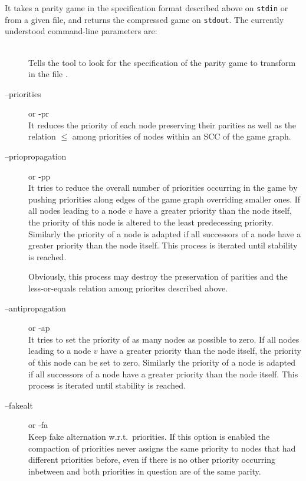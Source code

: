 It takes a parity game in the specification format described above
on \texttt{stdin} or from a given file, and returns the compressed game on \texttt{stdout}. The currently
understood command-line parameters are:
\begin{description}
\item[] \ \\
   Tells the tool to look for the specification of the parity game to transform in the file
   .

\item[{\ttfamily --priorities}] \enspace or {\ttfamily -pr} \\
    It reduces the priority of each node preserving their parities as well as the relation $\le$
    among priorities of nodes within an SCC of the game graph.

\item[{\ttfamily --priopropagation}] \enspace or {\ttfamily -pp} \\
    It tries to reduce the overall number of priorities occurring in the game by pushing priorities
    along edges of the game graph overriding smaller ones. If all nodes leading to a node $v$ have a
    greater priority than the node itself, the priority of this node is altered to the least predecessing
    priority. Similarly the priority of a node is adapted if all successors of a node have a greater
    priority than the node itself. This process is iterated until stability is reached.

    Obviously, this process may destroy the preservation of parities and the less-or-equals relation among
    priorites described above.

\item[{\ttfamily --antipropagation}] \enspace or {\ttfamily -ap} \\
	It tries to set the priority of as many nodes as possible to zero. If all nodes leading to a node
	$v$ have a greater priority than the node itself, the priority of this node can be set to zero.
	Similarly the priority of a node is adapted if all successors of a node have a greater priority than
	the node itself. This process is iterated until stability is reached.

\item[{\ttfamily  --fakealt}] \enspace or {\ttfamily -fa} \\
    Keep fake alternation w.r.t.\ priorities. If this option is enabled the compaction of priorities
    never assigns the same priority to nodes that had different priorities before, even if there is
    no other priority occurring inbetween and both priorities in question are of the same parity.


\end{description}
